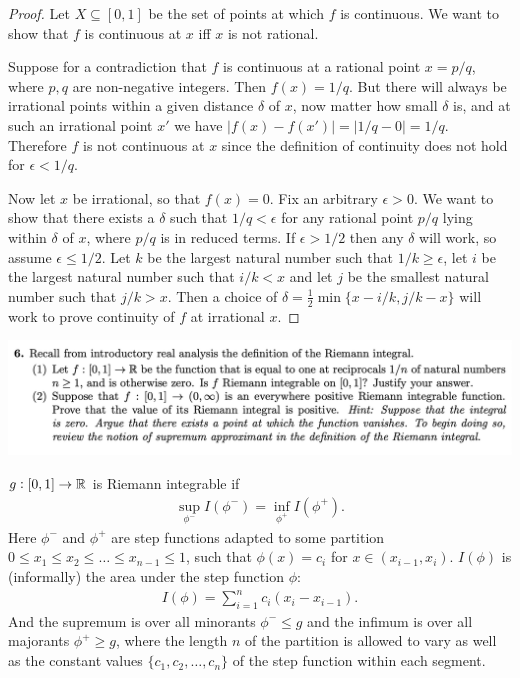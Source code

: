 \begin{proof}
  Let $X \subseteq [0, 1]$ be the set of points at which $f$ is continuous. We want to show that $f$ is
  continuous at $x$ iff $x$ is not rational.

  Suppose for a contradiction that $f$ is continuous at a rational point $x = p/q$, where $p, q$ are
  non-negative integers. Then $f(x) = 1/q$. But there will always be irrational points within a given
  distance $\delta$ of $x$, now matter how small $\delta$ is, and at such an irrational point $x'$ we
  have $|f(x) - f(x')| = |1/q - 0| = 1/q$. Therefore $f$ is not continuous at $x$ since the definition of
  continuity does not hold for $\epsilon < 1/q$.

  Now let $x$ be irrational, so that $f(x) = 0$. Fix an arbitrary $\epsilon > 0$. We want to show that there
  exists a $\delta$ such that $1/q < \epsilon$ for any rational point $p/q$ lying within $\delta$ of $x$,
  where $p/q$ is in reduced terms. If $\epsilon > 1/2$ then any $\delta$ will work, so
  assume $\epsilon \leq 1/2$. Let $k$ be the largest natural number such that $1/k \geq \epsilon$, let $i$ be
  the largest natural number such that $i/k < x$ and let $j$ be the smallest natural number such
  that $j/k > x$. Then a choice of $\delta = \frac{1}{2}\min\{x - i/k, j/k - x\}$ will work to prove continuity
  of $f$ at irrational $x$.
\end{proof}

\newpage
\begin{mdframed}
\includegraphics[width=400pt]{img/analysis--berkeley-202a--homework-1-f5e8.png}
\end{mdframed}


\begin{definition}
  $g: [0, 1] \to \mathbb{R}$ is Riemann integrable if
  \begin{align*}
    \sup_{\phi^-} I(\phi^-) = \inf_{\phi^+} I(\phi^+).
  \end{align*}
  Here $\phi^-$ and $\phi^+$ are step functions adapted​ to some
  partition $0 \leq x_1 \leq x_2 \leq \ldots \leq x_{n-1} \leq 1$, such that $\phi(x) = c_i$
  for $x \in (x_{i-1}, x_i)$. $I(\phi)$ is (informally) the area under the step function $\phi$:
  \begin{align*}
    I(\phi) = \sum_{i=1}^n c_i(x_i - x_{i-1}).
  \end{align*}
  And the supremum is over all minorants $\phi^- \leq g$ and the infimum is over all
  majorants $\phi^+ \geq g$, where the length $n$ of the partition is allowed to vary as well as the constant
  values $\{c_1, c_2, \ldots, c_n\}$ of the step function within each segment.
\end{definition}

